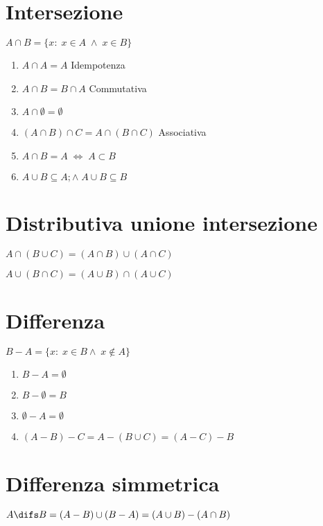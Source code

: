\section{Intersezione}
$A\cap B=\lbrace x:\;x\in A\;\wedge\; x\in B\rbrace$

{\centering
	
	\par
}
\begin{enumerate}
	\item $A\cap A=A$ Idempotenza
	\item $A\cap B=B\cap A$ Commutativa
	\item $A\cap\emptyset=\emptyset$
	\item $\left(A\cap B\right)\cap C=A\cap\left(B\cap C\right)$ Associativa
	\item $A\cap B=A\;\Leftrightarrow\; A\subset B$
	\item $A\cup B\subseteq A;\wedge\;A\cup B\subseteq B$ 
\end{enumerate}
\section{Distributiva unione intersezione}
$A\cap\left(B\cup C\right)=\left(A\cap B\right)\cup\left(A\cap C\right)$

$A\cup\left(B\cap C\right)=\left(A\cup B\right)\cap\left(A\cup C\right)$
\section{Differenza}
$B-A=\lbrace x:\; x\in B\wedge\; x\notin A\rbrace$

{\centering
	
\par}
\begin{enumerate}
	\item $B-A=\emptyset$
	\item $B-\emptyset=B$
	\item $\emptyset-A=\emptyset$
	\item $\left(A-B\right)-C=A-\left(B\cup C\right)=\left(A-C\right)-B$
\end{enumerate}
\section{Differenza simmetrica}
$A\difs B=\left(A-B\right)\cup\left(B-A\right)=\left(A\cup B\right)-\left(A\cap B\right)$

